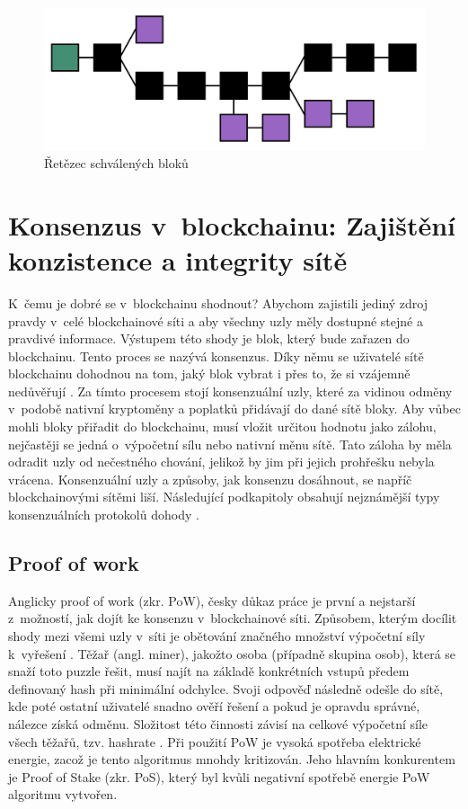 \begin{figure}
\centering
\includegraphics[width=\textwidth]{obrazky/vetve_bloku.png}
\caption{Řetězec schválených bloků \cite{longestChain}}
\label{fig:retezec}
\centering
\end{figure}

\section{Konsenzus v~blockchainu: Zajištění konzistence a integrity sítě} 
\label{konsenzus}
K~čemu je dobré se v~blockchainu shodnout? Abychom zajistili jediný zdroj pravdy v~celé blockchainové síti a aby všechny uzly měly dostupné stejné a pravdivé informace. Výstupem této shody je blok, který bude zařazen do blockchainu. Tento proces se nazývá konsenzus. Díky němu se uživatelé sítě blockchainu dohodnou na tom, jaký blok vybrat i přes to, že si vzájemně nedůvěřují \cite{Lashkar2021}. Za tímto procesem stojí konsenzuální uzly, které za vidinou odměny v~podobě nativní kryptoměny a poplatků přidávají do dané sítě bloky. Aby vůbec mohli bloky přiřadit do blockchainu, musí vložit určitou hodnotu jako zálohu, nejčastěji se jedná o~výpočetní sílu nebo nativní měnu sítě. Tato záloha by měla odradit uzly od nečestného chování, jelikož by jim při jejich prohřešku nebyla vrácena. Konsenzuální uzly a způsoby, jak konsenzu dosáhnout, se napříč blockchainovými sítěmi liší. Následující podkapitoly obsahují nejznámější typy konsenzuálních protokolů dohody \cite{Binance}.
\subsection*{Proof of work}
Anglicky proof of work (zkr. PoW), česky důkaz práce je první a nejstarší z~možností, jak dojít ke konsenzu v~blockchainové síti. Způsobem, kterým docílit shody mezi všemi uzly v~síti je obětování značného množství výpočetní síly k~vyřešení  \cite{POW}. Těžař (angl. miner), jakožto osoba (případně skupina osob), která se snaží toto puzzle řešit, musí najít na základě konkrétních vstupů předem definovaný hash při minimální odchylce. Svoji odpověď následně odešle do sítě, kde poté ostatní uživatelé snadno ověří řešení a pokud je opravdu správné, nálezce získá odměnu. Složitost této činnosti závisí na celkové výpočetní síle všech těžařů, tzv. hashrate \cite{POW_POS}. Při použití PoW je vysoká spotřeba elektrické energie, zacož je tento algoritmus mnohdy kritizován. Jeho hlavním konkurentem je Proof of Stake (zkr. PoS), který byl kvůli negativní spotřebě energie PoW algoritmu vytvořen. 
